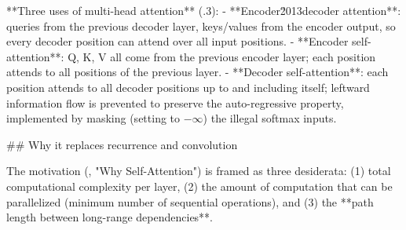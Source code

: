 \documentclass[10pt]{article}
\begin{document}
\begin{AnswerText}
**Three uses of multi-head attention** (.3):
- **Encoder\u2013decoder attention**: queries from the previous decoder layer, keys/values from the encoder output, so every decoder position can attend over all input positions.
- **Encoder self-attention**: Q, K, V all come from the previous encoder layer; each position attends to all positions of the previous layer.
- **Decoder self-attention**: each position attends to all decoder positions up to and including itself; leftward information flow is prevented to preserve the auto-regressive property, implemented by masking (setting to $-\infty$) the illegal softmax inputs.

## Why it replaces recurrence and convolution

The motivation (, "Why Self-Attention") is framed as three desiderata: (1) total computational complexity per layer, (2) the amount of computation that can be parallelized (minimum number of sequential operations), and (3) the **path length between long-range dependencies**.


\end{AnswerText}
\end{document}
